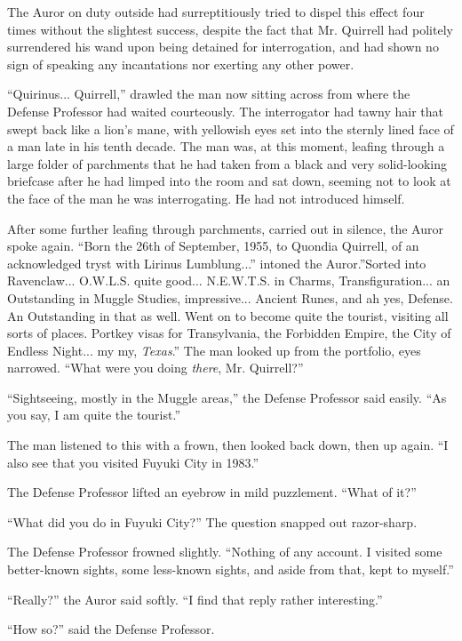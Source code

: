 The Auror on duty outside had surreptitiously tried to dispel this
effect four times without the slightest success, despite the fact that
Mr. Quirrell had politely surrendered his wand upon being detained for
interrogation, and had shown no sign of speaking any incantations nor
exerting any other power.

``Quirinus... Quirrell,'' drawled the man now sitting across from
where the Defense Professor had waited courteously. The interrogator had
tawny hair that swept back like a lion's mane, with yellowish eyes set
into the sternly lined face of a man late in his tenth decade. The man
was, at this moment, leafing through a large folder of parchments that
he had taken from a black and very solid-looking briefcase after he had
limped into the room and sat down, seeming not to look at the face of
the man he was interrogating. He had not introduced himself.

After some further leafing through parchments, carried out in silence,
the Auror spoke again. ``Born the 26th of September, 1955, to Quondia
Quirrell, of an acknowledged tryst with Lirinus Lumblung...''
intoned the Auror.''Sorted into Ravenclaw... O.W.L.S. quite
good... N.E.W.T.S. in Charms, Transfiguration... an
Outstanding in Muggle Studies, impressive... Ancient Runes, and ah
yes, Defense. An Outstanding in that as well. Went on to become quite
the tourist, visiting all sorts of places. Portkey visas for
Transylvania, the Forbidden Empire, the City of Endless Night... my
my, \emph{Texas}.'' The man looked up from the portfolio, eyes narrowed.
``What were you doing \emph{there}, Mr. Quirrell?''

``Sightseeing, mostly in the Muggle areas,'' the Defense Professor said
easily. ``As you say, I am quite the tourist.''

The man listened to this with a frown, then looked back down, then up
again. ``I also see that you visited Fuyuki City in 1983.''

The Defense Professor lifted an eyebrow in mild puzzlement. ``What of
it?''

``What did you do in Fuyuki City?'' The question snapped out
razor-sharp.

The Defense Professor frowned slightly. ``Nothing of any account. I
visited some better-known sights, some less-known sights, and aside from
that, kept to myself.''

``Really?'' the Auror said softly. ``I find that reply rather
interesting.''

``How so?'' said the Defense Professor.

